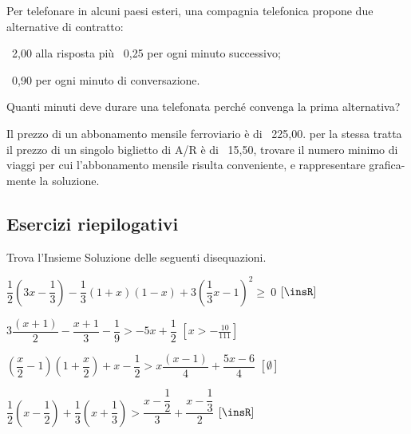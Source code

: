 \begin{multicols}{2}
 \begin{esercizio}[]
 \label{ese:dis_}
 Per telefonare in alcuni paesi esteri, una compagnia telefonica
propone due alternative di contratto:
\begin{enumeratea}
 \item \officialeuro\ 2,00 alla risposta più \officialeuro\ 0,25 per ogni 
minuto successivo;
\item \officialeuro\ 0,90 per ogni minuto di conversazione.
\end{enumeratea}
Quanti minuti deve durare una telefonata perché convenga la prima
alternativa?
 \end{esercizio}

\begin{esercizio}[]
 \label{ese:dis_}
 Il prezzo di un abbonamento mensile ferroviario è di \officialeuro\ 225,00.
 per la stessa tratta il prezzo di un singolo biglietto di A/R è 
di \officialeuro\ 15,50, trovare il numero minimo di viaggi per
cui l'abbonamento mensile risulta conveniente, e
rappresentare grafica-mente la soluzione.
 \end{esercizio}


\end{multicols}

\subsection{Esercizi riepilogativi}

\begin{esercizio}[\Ast]
 \label{ese:21.15}
Trova l'Insieme Soluzione delle seguenti disequazioni.
 \begin{enumeratea}
\item
 $\dfrac{1}{2}\left(3x-\dfrac{1}{3}\right)-\dfrac{1}{3}(1+x)(1-x)+
  3\left(\dfrac{1}{3}x-1\right)^{2}\ge~0$
 \hfill $\left[\insR\right]$
\item
 $3\dfrac{(x+1)}{2}-\dfrac{x+1}{3}-\dfrac{1}{9}>-5x+\dfrac{1}{2}$
 \hfill $\left[x>-{\frac{10}{111}}\right]$
\item
 $\left(\dfrac{x}{2}-1\right)\left(1+\dfrac{x}{2}\right)+x-\dfrac{1}{2}>
  x\dfrac{(x-1)}{4}+\dfrac{5x-6}{4}$
 \hfill $\left[\emptyset\right]$
\item
 $\dfrac{1}{2}\left(x-\dfrac{1}{2}\right)+\dfrac{1}{3}\left(x+
  \dfrac{1}{3}\right)>\dfrac{x-\dfrac{1}{2}}{3}+\dfrac{x-\dfrac{1}{3}}{2}$
 \hfill $\left[\insR\right]$
\end{enumeratea}
\end{esercizio}

